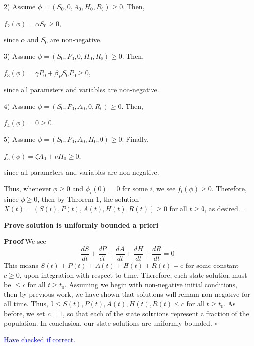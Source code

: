 \documentclass[12pt]{article}
\begin{document}
2) Assume $\phi = (S_0, 0, A_0, H_0, R_0) \geq 0.$ Then, 
\begin{center}
$f_2(\phi)=\alpha S_0 \geq 0,$
\end{center}
since $\alpha$ and $S_0$ are non-negative. 

3) Assume $\phi = (S_0, P_0, 0, H_0, R_0) \geq 0.$ Then,
\begin{center}
$f_3(\phi)=\gamma P_0 + \beta_{P} S_0 P_0 \geq 0,$
\end{center}
since all parameters and variables are non-negative. 
 
4) Assume $\phi = (S_0, P_0, A_0, 0, R_0) \geq 0.$ Then,
\begin{center}
$f_4(\phi)=0 \geq 0.$
\end{center}
 
5)  Assume $\phi = (S_0, P_0, A_0, H_0, 0) \geq 0.$ Finally,
\begin{center}
$f_5(\phi)=\zeta A_0 +\nu H_0 \geq 0,$
\end{center}
since all parameters and variables are non-negative. 

Thus, whenever $\phi \geq 0$ and $\phi_i(0)=0$ for some $i$, we see $f_i(\phi) \geq 0$. Therefore, since $\phi \geq 0$, then by Theorem 1, the solution $X(t)=(S(t), P(t), A(t), H(t), R(t)) \geq 0$ for all $t \geq 0$, as desired. $\square$




 \textbf{Prove solution is uniformly bounded a priori}

 \textbf{Proof} We see $$\frac{dS}{dt} + \frac{dP}{dt} + \frac{dA}{dt} +\frac{dH}{dt} +\frac{dR}{dt} = 0$$
This means  $S(t) + P(t) + A(t) + H(t) +R(t) = c$ for some constant $c \geq 0$, upon integration with respect to time. Therefore, each state solution must be $\leq c$ for all $t \geq t_0$. Assuming we begin with non-negative initial conditions, then by previous work, we have shown that solutions will remain non-negative for all time. Thus, $0 \leq S(t), P(t), A(t), H(t), R(t) \leq c$ for all $t \geq t_0.$ As before, we set $c=1$, so that each of the state solutions represent a fraction of the population. In conclusion, our state solutions are uniformly bounded. $\square$
 
 \textcolor{blue}{Have checked if correct.}

 



\end{document}
